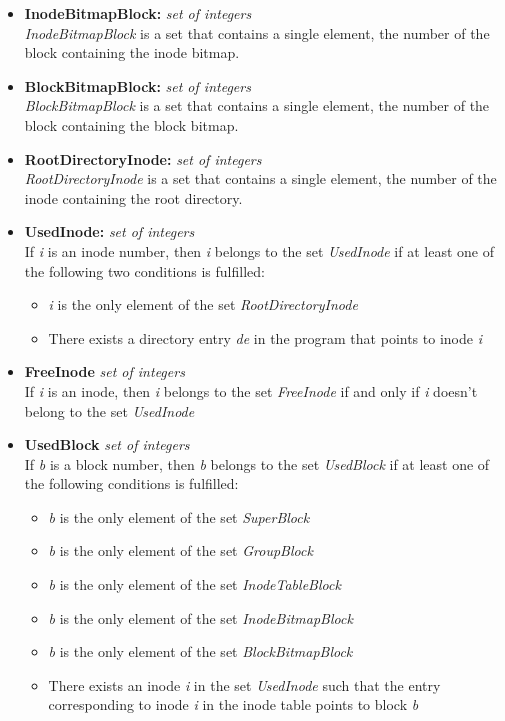 \documentclass{article}
\begin{document}
\begin{flushleft}
\begin{itemize}
  \item{{\bf InodeBitmapBlock:} {\it set of integers} 
  \\ {\it InodeBitmapBlock} is a set that contains a single element, the number
of the block containing the inode bitmap.}

  \item{{\bf BlockBitmapBlock:} {\it set of integers} 
  \\ {\it BlockBitmapBlock} is a set that contains a single element, the number
of the block containing the block bitmap.}

  \item{{\bf RootDirectoryInode:} {\it set of integers}
  \\ {\it RootDirectoryInode} is a set that contains a single element, the 
number of the inode containing the root directory.}


  \item{{\bf UsedInode:} {\it set of integers}
  \\If {\it i} is an inode number, then {\it i} belongs to the set 
{\it UsedInode} if at least one of the following two conditions is fulfilled:
      \begin{itemize}
         \item{{\it i} is the only element of the set {\it RootDirectoryInode}}
         \item{There exists a directory entry {\it de} in the program that 
          points to inode {\it i}}
      \end{itemize} }

  \item{{\bf FreeInode} {\it set of integers}
  \\If {\it i} is an inode, then {\it i} belongs to the set {\it FreeInode} 
if and only if {\it i} doesn't belong to the set {\it UsedInode}}

  \item{{\bf UsedBlock} {\it set of integers}
  \\If {\it b} is a block number, then {\it b} belongs 
to the set {\it UsedBlock} if at least one of the following conditions is 
fulfilled:
      \begin{itemize}
         \item{{\it b} is the only element of the set {\it SuperBlock}}
         \item{{\it b} is the only element of the set {\it GroupBlock}}
         \item{{\it b} is the only element of the set {\it InodeTableBlock}}
         \item{{\it b} is the only element of the set {\it InodeBitmapBlock}}
         \item{{\it b} is the only element of the set {\it BlockBitmapBlock}}
         \item{There exists an inode {\it i} in the set {\it UsedInode} such 
               that the entry corresponding to inode {\it i} in the inode 
               table points to block {\it b}}
      \end{itemize} }


\end{itemize}
\end{flushleft}
\end{document}

